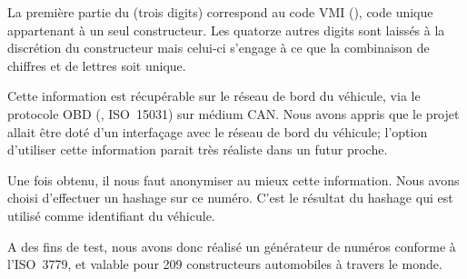 La première partie du \vin{} (trois digits) correspond au code VMI (), code unique appartenant à un seul constructeur.
Les quatorze autres digits sont laissés à la discrétion du constructeur mais celui-ci s'engage à ce que la combinaison de chiffres et de lettres soit unique.

Cette information est récupérable sur le réseau de bord du véhicule, via le protocole OBD (, ISO~15031) sur médium CAN. Nous avons appris que le projet \airplug{} allait être doté d'un interfaçage avec le réseau de bord du véhicule; l'option d'utiliser cette information parait très réaliste dans un futur proche.

Une fois obtenu, il nous faut anonymiser au mieux cette information. Nous avons choisi d'effectuer un hashage sur ce numéro. C'est le résultat du hashage qui est utilisé comme identifiant du véhicule.

A des fins de test, nous avons donc réalisé un générateur de numéros \vin{} conforme à l'ISO~3779, et valable pour 209 constructeurs automobiles à travers le monde.

